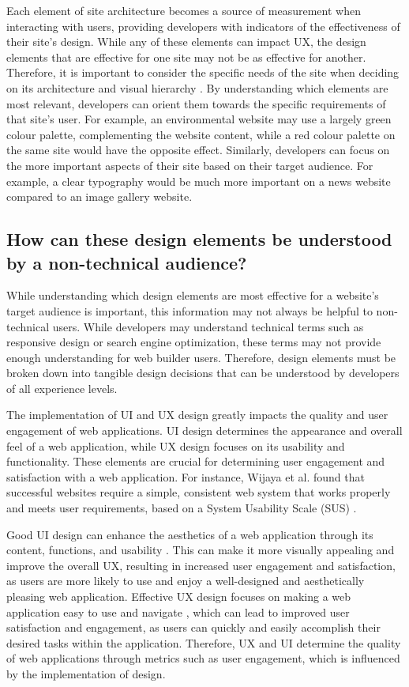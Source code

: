 \documentclass[article]{IEEEtran}
\begin{document}
                Each element of site architecture becomes a source of measurement when interacting with users, providing developers with indicators of the effectiveness of their site's design. While any of these elements can impact UX, the design elements that are effective for one site may not be as effective for another. Therefore, it is important to consider the specific needs of the site when deciding on its architecture and visual hierarchy \cite{ivory}. By understanding which elements are most relevant, developers can orient them towards the specific requirements of that site's user. For example, an environmental website may use a largely green colour palette, complementing the website content, while a red colour palette on the same site would have the opposite effect. Similarly, developers can focus on the more important aspects of their site based on their target audience. For example, a clear typography would be much more important on a news website compared to an image gallery website.
    
            \subsection{How can these design elements be understood by a non-technical audience?}
                While understanding which design elements are most effective for a website's target audience is important, this information may not always be helpful to non-technical users. While developers may understand technical terms such as responsive design or search engine optimization, these terms may not provide enough understanding for web builder users. Therefore, design elements must be broken down into tangible design decisions that can be understood by developers of all experience levels.
                
                The implementation of UI and UX design greatly impacts the quality and user engagement of web applications. UI design determines the appearance and overall feel of a web application, while UX design focuses on its usability and functionality. These elements are crucial for determining user engagement and satisfaction with a web application. For instance, Wijaya et al. found that successful websites require a simple, consistent web system that works properly and meets user requirements, based on a System Usability Scale (SUS) \cite{wijaya, SUS}.
                
                Good UI design can enhance the aesthetics of a web application through its content, functions, and usability \cite{gunawan}. This can make it more visually appealing and improve the overall UX, resulting in increased user engagement and satisfaction, as users are more likely to use and enjoy a well-designed and aesthetically pleasing web application. Effective UX design focuses on making a web application easy to use and navigate \cite{gunawan}, which can lead to improved user satisfaction and engagement, as users can quickly and easily accomplish their desired tasks within the application. Therefore, UX and UI determine the quality of web applications through metrics such as user engagement, which is influenced by the implementation of design.
\end{document}
